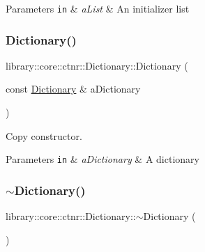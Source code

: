 \begin{DoxyParams}[1]{Parameters}
\mbox{\tt in}  & {\em a\+List} & An initializer list \\
\hline
\end{DoxyParams}
\mbox{\label{classlibrary_1_1core_1_1ctnr_1_1_dictionary_a17e09d0a01799ed41cb6dfe9cf7dd52c}} 
\subsubsection{\texorpdfstring{Dictionary()}{Dictionary()}\hspace{0.1cm}{\footnotesize\ttfamily [2/2]}}
{\footnotesize\ttfamily library\+::core\+::ctnr\+::\+Dictionary\+::\+Dictionary (\begin{DoxyParamCaption}\item[{const \hyperlink{classlibrary_1_1core_1_1ctnr_1_1_dictionary}{Dictionary} \&}]{a\+Dictionary }\end{DoxyParamCaption})}



Copy constructor. 


\begin{DoxyParams}[1]{Parameters}
\mbox{\tt in}  & {\em a\+Dictionary} & A dictionary \\
\hline
\end{DoxyParams}
\mbox{\label{classlibrary_1_1core_1_1ctnr_1_1_dictionary_a4b06c3b334776cb177aa3423bce0afaa}} 
\subsubsection{\texorpdfstring{$\sim$\+Dictionary()}{~Dictionary()}}
{\footnotesize\ttfamily library\+::core\+::ctnr\+::\+Dictionary\+::$\sim$\+Dictionary (\begin{DoxyParamCaption}{ }\end{DoxyParamCaption})}



